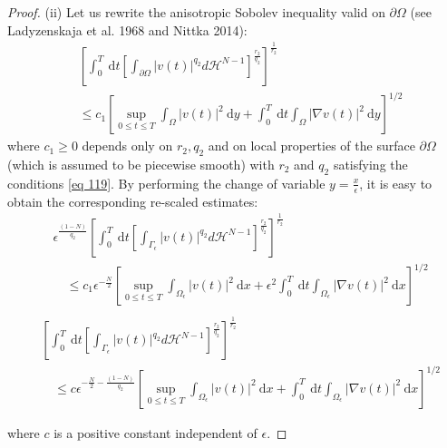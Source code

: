 \begin{proof}
(ii) Let us rewrite the anisotropic Sobolev inequality valid on $\partial \Omega$ (see Ladyzenskaja et al. 1968 and Nittka 2014):
\begin{equation}
  \begin{aligned}
&{\left[\int_{0}^{T} \mathrm{~d} t\left[\int_{\partial \Omega}|v(t)|^{q_{2}} d \mathcal{H}^{N-1}\right]^{\frac{r_{2}}{q_{2}}}\right]^{\frac{1}{r_{2}}}} \\
&\leq c_{1}\left[\sup _{0 \leq t \leq T} \int_{\Omega}|v(t)|^{2} \mathrm{~d} y+\int_{0}^{T} \mathrm{~d} t \int_{\Omega}|\nabla v(t)|^{2} \mathrm{~d} y\right]^{1 / 2}
\end{aligned}
\label{124}\end{equation}
where $c_{1} \geq 0$ depends only on $r_{2}, q_{2}$ and on local properties of the surface $\partial \Omega$ (which is assumed to be piecewise smooth) with $r_{2}$ and $q_{2}$ satisfying the conditions \eqref{eq 119}. By performing the change of variable $y=\frac{x}{\epsilon}$, it is easy to obtain the corresponding re-scaled estimates:
\begin{equation}
  \begin{aligned}
&\epsilon^{\frac{(1-N)}{q_{2}}}\left[\int_{0}^{T} \mathrm{~d} t\left[\int_{\Gamma_{\epsilon}}|v(t)|^{q_{2}} d \mathcal{H}^{N-1}\right]^{\frac{r_{2}}{q_{2}}}\right]^{\frac{1}{r_{2}}} \\
&\quad \leq c_{1} \epsilon^{-\frac{N}{2}}\left[\sup _{0 \leq t \leq T} \int_{\Omega_{\epsilon}}|v(t)|^{2} \mathrm{~d} x+\epsilon^{2} \int_{0}^{T} \mathrm{~d} t \int_{\Omega_{\epsilon}}|\nabla v(t)|^{2} \mathrm{~d} x\right]^{1 / 2} \\
\end{aligned}
\label{eq 125}\end{equation}
\begin{equation}
\begin{aligned}
&{\left[\int_{0}^{T} \mathrm{~d} t\left[\int_{\Gamma_{\epsilon}}|v(t)|^{q_{2}} d \mathcal{H}^{N-1}\right]^{\frac{r_{2}}{q_{2}}}\right]^{\frac{1}{r_{2}}}} \\
&\quad \leq c \epsilon^{-\frac{N}{2}-\frac{(1-N)}{q_{2}}}\left[\sup _{0 \leq t \leq T} \int_{\Omega_{\epsilon}}|v(t)|^{2} \mathrm{~d} x+\int_{0}^{T} \mathrm{~d} t \int_{\Omega_{\epsilon}}|\nabla v(t)|^{2} \mathrm{~d} x\right]^{1 / 2}
\end{aligned}
\label{eq 126}\end{equation}

where $c$ is a positive constant independent of $\epsilon$.
\end{proof}
